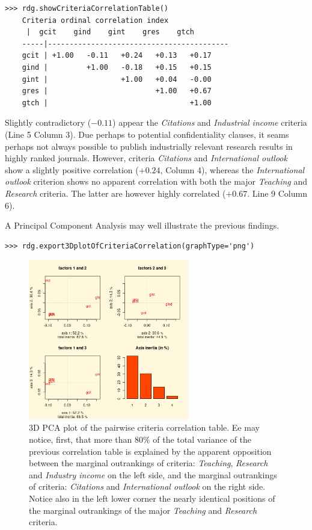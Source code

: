 \begin{lstlisting}
>>> rdg.showCriteriaCorrelationTable()
    Criteria ordinal correlation index
	 |  gcit    gind    gint    gres    gtch   
    -----|------------------------------------------
    gcit | +1.00   -0.11   +0.24   +0.13   +0.17   
    gind |         +1.00   -0.18   +0.15   +0.15   
    gint |                 +1.00   +0.04   -0.00   
    gres |                         +1.00   +0.67   
    gtch |                                 +1.00   
\end{lstlisting}

Slightly contradictory ($-0.11$) appear the \emph{Citations} and \emph{Industrial income} criteria (Line 5 Column 3). Due perhaps to potential confidentiality clauses, it seams perhaps not always possible to publish industrially relevant research results in highly ranked journals. However, criteria \emph{Citations} and \emph{International outlook} show a slightly positive correlation ($+0.24$, Column 4), whereas the \emph{International outlook} criterion shows no apparent correlation with both the major \emph{Teaching} and \emph{Research} criteria. The latter are however highly correlated ($+0.67$. Line 9 Column 6).

A Principal Component Analysis may well illustrate the previous findings.

\begin{lstlisting}
>>> rdg.export3DplotOfCriteriaCorrelation(graphType='png')
\end{lstlisting}

\begin{figure}[h]
\sidecaption
\includegraphics[width=7cm]{Figures/the_cs_3DCorrelation.png}
\caption{3D PCA plot of the pairwise criteria correlation table. Ee may notice, first, that more than $80\%$ of the total variance of the previous correlation table is explained by the apparent opposition between the marginal outrankings of criteria: \emph{Teaching}, \emph{Research} and \emph{Industry income} on the left side, and the marginal outrankings of criteria: \emph{Citations} and \emph{International outlook} on the right side. Notice also in the left lower corner the nearly identical positions of the marginal outrankings of the major \emph{Teaching} and \emph{Research} criteria.}
\label{fig:13.3}       %
\end{figure}

